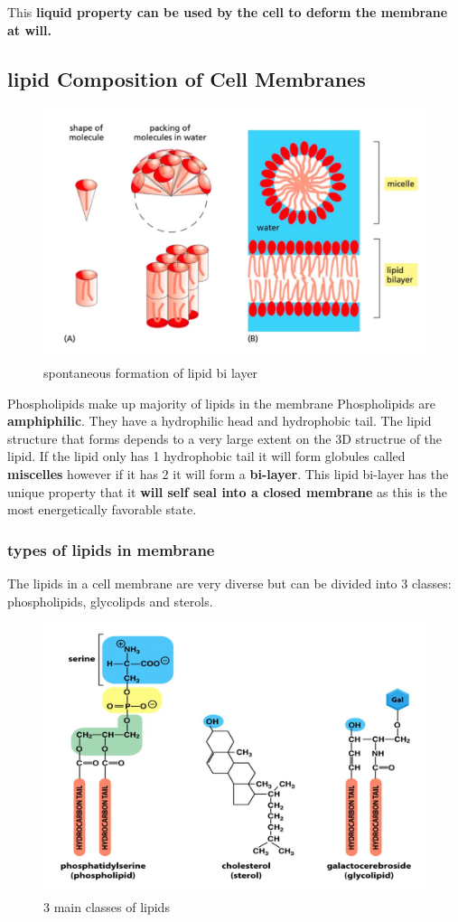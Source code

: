 \documentclass[../main.tex]{subfiles}
\begin{document}
        This \textbf{liquid property can be used by the cell to deform the membrane at will.}

        \subsection{lipid Composition of Cell Membranes}
        \begin{figure}[H]
            \centering
            \includegraphics[width=0.5\linewidth]{Sum_Cell_Bio_II//lectures//cbII1/biLayer.png}
            \caption{spontaneous formation of lipid bi layer}
            \label{fig:bilayer}
        \end{figure}
        Phospholipids make up majority of lipids in the membrane Phospholipids are \textbf{amphiphilic}. They have a hydrophilic head and hydrophobic tail. The lipid structure that forms depends to a very large extent on the 3D structrue of the lipid. If the lipid only has 1 hydrophobic tail it will form globules called \textbf{miscelles} however if it has 2 it will form a \textbf{bi-layer}. This lipid bi-layer has the unique property that it \textbf{will self seal into a closed membrane} as this is the most energetically favorable state. 

        \subsubsection{types of lipids in membrane}
        The lipids in a cell membrane are very diverse but can be divided into 3 classes: phospholipids, glycolipds and sterols.
            \begin{figure}[H]
                \centering
                \includegraphics[width=0.6\linewidth]{Sum_Cell_Bio_II//lectures//cbII1/typesLipids.png}
                \caption{3 main classes of lipids}
                \label{fig:lipids}
            \end{figure}
            
\end{document}
